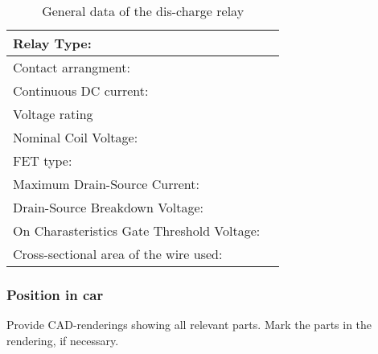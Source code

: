 \begin{table}[H]
	\centering
	\caption{General data of the dis-charge relay}
	\begin{tabularx}{\textwidth}{|X|X|}
		\hline
		Relay Type: &  \\[\TableSize]
		\hline
		Contact arrangment: &  \\[\TableSize]
		\hline
		Continuous DC current:  &  \\[\TableSize]
		\hline
		Voltage rating  & \\[\TableSize]
		\hline
		Nominal Coil Voltage: & \\[\TableSize]
		\hline
		FET type: &  \\[\TableSize]
		\hline
		Maximum Drain-Source Current: &\\[\TableSize]
		\hline
		Drain-Source Breakdown Voltage: &  \\[\TableSize]
		\hline
		On Charasteristics Gate Threshold Voltage: & \\[\TableSize]
		\hline
		Cross-sectional area of the wire used: & \\[\TableSize]
		\hline
	\end{tabularx}%
	\label{tab:discharge-relay}%
\end{table}%


\subsubsection{Position in car}
Provide CAD-renderings showing all relevant parts. Mark the parts in the rendering, if necessary.